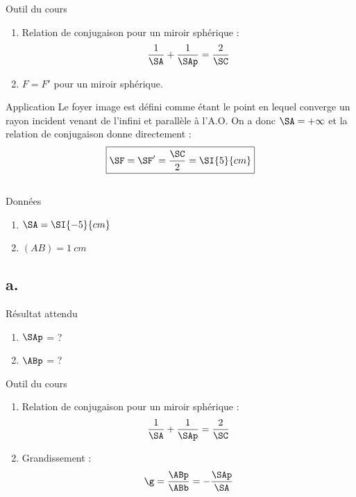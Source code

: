 \documentclass[10pt,notitlepage]{book}
\begin{document}
\begin{NCdemo}{Outil du cours}
    \begin{enumerate}
        \item Relation de conjugaison pour un miroir sphérique :
            \[ \frac{1}{\SA} + \frac{1}{\SAp} = \frac{2}{\SC} \]
        \item $F = F'$ pour un miroir sphérique.
    \end{enumerate}
\end{NCdemo}

\begin{NCexem}{Application}
    Le foyer image est défini comme étant le point en lequel converge un rayon
    incident venant de l'infini et parallèle à l'A.O. On a donc $\SA = +\infty$
    et la relation de conjugaison donne directement :
    \[ \boxed{\SF = \SF' = \frac{\SC}{2} = \SI{5}{cm}} \]
\end{NCexem}

\subsection{}
\begin{NCdefi}{Données}
    \begin{enumerate}
        \item $\SA = \SI{-5}{cm}$
        \item $(AB) = \SI{1}{cm}$
    \end{enumerate}
\end{NCdefi}

\setcounter{subsection}{1}
\subsection{a.}
\begin{NCprop}{Résultat attendu}
    \begin{enumerate}
        \item $\SAp$ = ?
        \item $\ABp$ = ?
    \end{enumerate}
\end{NCprop}

\begin{NCdemo}{Outil du cours}
    \begin{enumerate}
        \item Relation de conjugaison pour un miroir sphérique :
            \[ \frac{1}{\SA} + \frac{1}{\SAp} = \frac{2}{\SC} \]
        \item Grandissement :
            \[ \g = \frac{\ABp}{\ABb} = - \frac{\SAp}{\SA} \]
    \end{enumerate}
    
\end{NCdemo}
\end{document}
